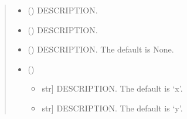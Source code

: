 \documentclass[letterpaper,10pt,english]{sphinxmanual}
\begin{document}

\begin{fulllineitems}
\label{\detokenize{plots:ggcas.plots.scat_xhist}}
\pysigstartsignatures
{}
\pysigstopsignatures\begin{quote}\begin{description}
\begin{itemize}
\item {} 
\sphinxAtStartPar
{} () \textendash{} DESCRIPTION.

\item {} 
\sphinxAtStartPar
{} () \textendash{} DESCRIPTION.

\item {} 
\sphinxAtStartPar
{} (\sphinxstyleliteralemphasis{\sphinxupquote{, }}) \textendash{} DESCRIPTION. The default is None.

\item {} 
\sphinxAtStartPar
{} () \textendash{} \begin{itemize}
\item {} \begin{description}
\sphinxlineitem{xlabel}{[}str{]}
\sphinxAtStartPar
DESCRIPTION. The default is ‘x’.

\end{description}

\item {} \begin{description}
\sphinxlineitem{ylabel}{[}str{]}
\sphinxAtStartPar
DESCRIPTION. The default is ‘y’.


\end{description}
\end{itemize}
\end{itemize}
\end{description}
\end{quote}
\end{fulllineitems}
\end{document}
